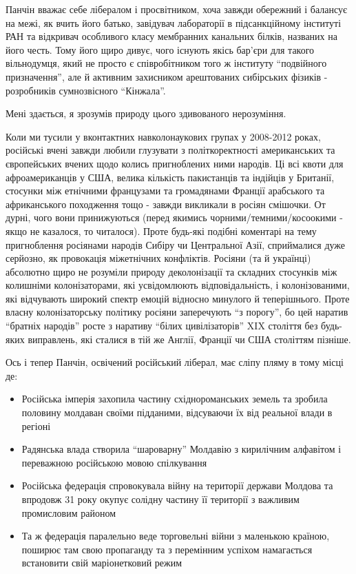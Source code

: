 Панчін вважає себе лібералом і просвітником, хоча завжди обережний і балансує
на межі, як вчить його батько, завідувач лабораторії в підсанкційному інституті
РАН та відкривач особливого класу мембранних канальних білків, названих на його
честь. Тому його щиро дивує, чого існують якісь бар'єри для такого вільнодумця,
який не просто є співробітником того ж інституту \enquote{подвійного
призначення}, але й активним захисником арештованих сибірських фізиків -
розробників сумнозвісного \enquote{Кінжала}. 

Мені здається, я зрозумів природу цього здивованого нерозуміння.

Коли ми тусили у вконтактних навколонаукових групах у 2008-2012 роках,
російські вчені завжди любили глузувати з політкоректності американських та
європейських вчених щодо колись пригноблених ними народів. Ці всі квоти для
афроамериканців у США, велика кількість пакистанців та індійців у Британії,
стосунки між етнічними французами та громадянами Франції арабського та
африканського походження тощо - завжди викликали в росіян смішочки. От дурні,
чого вони принижуються (перед якимись чорними/темними/косоокими - якщо не
казалося, то читалося). Проте будь-які подібні коментарі на тему пригноблення
росіянами народів Сибіру чи Центральної Азії, сприймалися дуже серйозно, як
провокація міжетнічних конфліктів. Росіяни (та й українці) абсолютно щиро не
розуміли природу деколонізації та складних стосунків між колишніми
колонізаторами, які усвідомлюють відповідальність, і колонізованими, які
відчувають широкий спектр емоцій відносно минулого й теперішнього. Проте власну
колонізаторську політику росіяни заперечують \enquote{з порогу}, бо цей наратив
\enquote{братніх народів} росте з наративу \enquote{білих цивілізаторів} XIX століття без
будь-яких виправлень, які сталися в тій же Англії, Франції чи США століттям
пізніше.

Ось і тепер Панчін, освічений російський ліберал, має сліпу пляму в тому місці де: 

\begin{itemize} %
\item Російська імперія захопила частину східнороманських земель та зробила
половину молдаван своїми підданими, відсуваючи їх від реальної влади в регіоні

\item Радянська влада створила \enquote{шароварну} Молдавію з кирилічним алфавітом і
переважною російською мовою спілкування

\item Російська федерація спровокувала війну на території держави Молдова та
впродовж 31 року окупує солідну частину її території з важливим промисловим
районом

\item Та ж федерація паралельно веде торговельні війни з маленькою країною, поширює
там свою пропаганду та з перемінним успіхом намагається встановити свій
маріонетковий режим
\end{itemize} %

